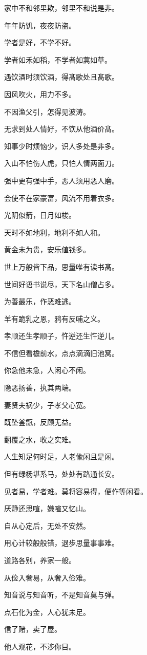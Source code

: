 \documentclass[12pt,oneside]{book}
\begin{document}
家中不和邻里欺，邻里不和说是非。

年年防饥，夜夜防盗。

学者是好，不学不好。

学者如禾如稻，不学者如蒿如草。

遇饮酒时须饮酒，得髙歌处且髙歌。

因风吹火，用力不多。

不因渔父引，怎得见波涛。

无求到处人情好，不饮从他酒价髙。

知事少时烦恼少，识人多处是非多。

入山不怕伤人虎，只怕人情两面刀。

强中更有强中手，恶人须用恶人磨。

会使不在家豪富，风流不用着衣多。

光阴似箭，日月如梭。

天时不如地利，地利不如人和。

黄金未为贵，安乐値钱多。

世上万般皆下品，思量唯有读书髙。

世间好语书说尽，天下名山僧占多。

为善最乐，作恶难逃。

羊有跪乳之恩，鸦有反哺之义。

孝顺还生孝顺子，忤逆还生忤逆儿。

不信但看檐前水，点点滴滴旧池窝。

你急他未急，人闲心不闲。

隐恶扬善，执其两端。

妻贤夫祸少，子孝父心宽。

既坠釜甑，反顾无益。

翻覆之水，收之实难。

人生知足何时足，人老偸闲且是闲。

但有绿杨堪系马，处处有路通长安。

见者易，学者难。莫将容易得，便作等闲看。

厌静还思喧，嫌喧又忆山。

自从心定后，无处不安然。

用心计较般般错，退歩思量事事难。

道路各别，养家一般。

从俭入奢易，从奢入俭难。

知音说与知音听，不是知音莫与弹。

点石化为金，人心犹未足。

信了赌，卖了屋。

他人观花，不渉你目。
\end{document}
